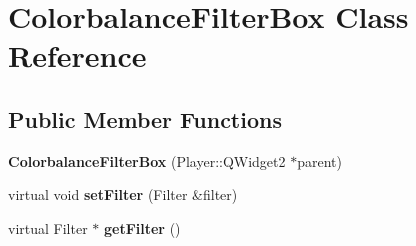 \hypertarget{classColorbalanceFilterBox}{}\section{Colorbalance\+Filter\+Box Class Reference}
\label{classColorbalanceFilterBox}
\subsection*{Public Member Functions}
\begin{DoxyCompactItemize}
\item 
\hypertarget{classColorbalanceFilterBox_a01560e7eee7bbfd1f9269dab9f74a5f5}{}{\bfseries Colorbalance\+Filter\+Box} (Player\+::\+Q\+Widget2 $\ast$parent)\label{classColorbalanceFilterBox_a01560e7eee7bbfd1f9269dab9f74a5f5}

\item 
\hypertarget{classColorbalanceFilterBox_a09e99b0db09b8468ce7d7e0f98293ac5}{}virtual void {\bfseries set\+Filter} (Filter \&filter)\label{classColorbalanceFilterBox_a09e99b0db09b8468ce7d7e0f98293ac5}

\item 
\hypertarget{classColorbalanceFilterBox_ad7b14770615490d1445c958c79fd3adb}{}virtual Filter $\ast$ {\bfseries get\+Filter} ()\label{classColorbalanceFilterBox_ad7b14770615490d1445c958c79fd3adb}

\end{DoxyCompactItemize}
